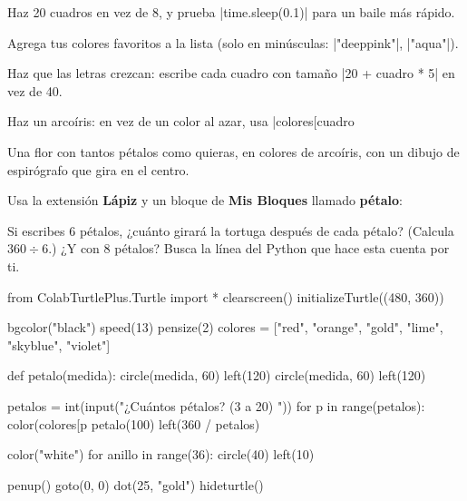 \begin{challenge}
\tick Haz 20 cuadros en vez de 8, y prueba \py|time.sleep(0.1)| para un baile más rápido.\par
\tick Agrega tus colores favoritos a la lista (solo en minúsculas: \py|"deeppink"|, \py|"aqua"|).\par
\tick Haz que las letras crezcan: escribe cada cuadro con tamaño \py|20 + cuadro * 5| en vez de 40.\par
\tick Haz un arcoíris: en vez de un color al azar, usa \py|colores[cuadro %
\end{challenge}


Una flor con tantos pétalos como quieras, en colores de arcoíris, con un dibujo de espirógrafo que gira en el centro.

Usa la extensión \textbf{Lápiz} y un bloque de \textbf{Mis Bloques} llamado \textbf{pétalo}:

\begin{center}
\begin{scratch}
\end{scratch}
\end{center}

\begin{think}
Si escribes 6 pétalos, ¿cuánto girará la tortuga después de cada pétalo? (Calcula $360 \div 6$.) ¿Y con 8 pétalos? Busca la línea del Python que hace esta cuenta por ti.
\end{think}

\begin{typethis}
from ColabTurtlePlus.Turtle import *
clearscreen()
initializeTurtle((480, 360))

bgcolor("black")
speed(13)
pensize(2)
colores = ["red", "orange", "gold", "lime",
           "skyblue", "violet"]

def petalo(medida):
    circle(medida, 60)
    left(120)
    circle(medida, 60)
    left(120)

petalos = int(input("¿Cuántos pétalos? (3 a 20) "))
for p in range(petalos):
    color(colores[p %
    petalo(100)
    left(360 / petalos)

color("white")
for anillo in range(36):
    circle(40)
    left(10)

penup()
goto(0, 0)
dot(25, "gold")
hideturtle()
\end{typethis}

